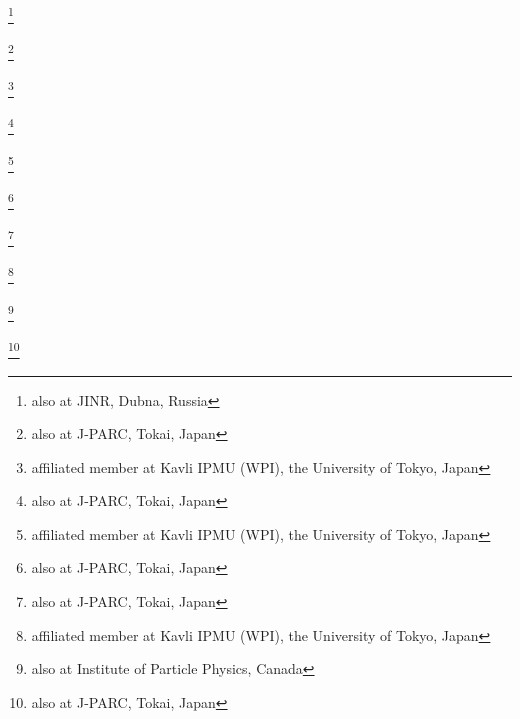 \documentclass[%
 reprint,
superscriptaddress,
 amsmath,amssymb,
 aps,
]{revtex4-1}
\begin{document}
\author{L.\,Pickard}\INSTFB
\author{E.S.\,Pinzon Guerra}\INSTH
\author{C.\,Pistillo}\INSTEE
\author{P.\,Plonski}\INSTDH
\author{E.\,Poplawska}\INSTFA
\author{B.\,Popov}\thanks{also at JINR, Dubna, Russia}\INSTBB
\author{M.\,Posiadala-Zezula}\INSTDJ
\author{J.-M.\,Poutissou}\INSTB
\author{R.\,Poutissou}\INSTB
\author{P.\,Przewlocki}\INSTDF
\author{B.\,Quilain}\INSTBA
\author{E.\,Radicioni}\INSTGF
\author{P.N.\,Ratoff}\INSTEJ
\author{M.\,Ravonel}\INSTEG
\author{M.A.M.\,Rayner}\INSTEG
\author{A.\,Redij}\INSTEE
\author{M.\,Reeves}\INSTEJ
\author{E.\,Reinherz-Aronis}\INSTFG
\author{C.\,Riccio}\INSTBE
\author{P.A.\,Rodrigues}\INSTGD
\author{P.\,Rojas}\INSTFG
\author{E.\,Rondio}\INSTDF
\author{S.\,Roth}\INSTBC
\author{A.\,Rubbia}\INSTEF
\author{D.\,Ruterbories}\INSTFG
\author{A.\,Rychter}\INSTDH
\author{R.\,Sacco}\INSTFA
\author{K.\,Sakashita}\thanks{also at J-PARC, Tokai, Japan}\INSTCB
\author{F.\,S\'anchez}\INSTED
\author{F.\,Sato}\INSTCB
\author{E.\,Scantamburlo}\INSTEG
\author{K.\,Scholberg}\thanks{affiliated member at Kavli IPMU (WPI), the University of Tokyo, Japan}\INSTFH
\author{S.\,Schoppmann}\INSTBC
\author{J.\,Schwehr}\INSTFG
\author{M.\,Scott}\INSTB
\author{Y.\,Seiya}\INSTCF
\author{T.\,Sekiguchi}\thanks{also at J-PARC, Tokai, Japan}\INSTCB
\author{H.\,Sekiya}\thanks{affiliated member at Kavli IPMU (WPI), the University of Tokyo, Japan}\INSTBJ\INSTHA
\author{D.\,Sgalaberna}\INSTEF
\author{R.\,Shah}\INSTEH\INSTGG
\author{F.\,Shaker}\INSTGH
\author{D.\,Shaw}\INSTEJ
\author{M.\,Shiozawa}\INSTBJ\INSTHA
\author{S.\,Short}\INSTFA
\author{Y.\,Shustrov}\INSTEB
\author{P.\,Sinclair}\INSTEI
\author{B.\,Smith}\INSTEI
\author{M.\,Smy}\INSTGA
\author{J.T.\,Sobczyk}\INSTEA
\author{H.\,Sobel}\INSTGA\INSTHA
\author{M.\,Sorel}\INSTEC
\author{L.\,Southwell}\INSTEJ
\author{P.\,Stamoulis}\INSTEC
\author{J.\,Steinmann}\INSTBC
\author{B.\,Still}\INSTFA
\author{Y.\,Suda}\INSTCH
\author{A.\,Suzuki}\INSTCC
\author{K.\,Suzuki}\INSTCD
\author{S.Y.\,Suzuki}\thanks{also at J-PARC, Tokai, Japan}\INSTCB
\author{Y.\,Suzuki}\INSTHA\INSTHA
\author{R.\,Tacik}\INSTE\INSTB
\author{M.\,Tada}\thanks{also at J-PARC, Tokai, Japan}\INSTCB
\author{S.\,Takahashi}\INSTCD
\author{A.\,Takeda}\INSTBJ
\author{Y.\,Takeuchi}\INSTCC\INSTHA
\author{H.K.\,Tanaka}\thanks{affiliated member at Kavli IPMU (WPI), the University of Tokyo, Japan}\INSTBJ
\author{H.A.\,Tanaka}\thanks{also at Institute of Particle Physics, Canada}\INSTD
\author{M.M.\,Tanaka}\thanks{also at J-PARC, Tokai, Japan}\INSTCB
\author{D.\,Terhorst}\INSTBC
\author{R.\,Terri}\INSTFA
\author{L.F.\,Thompson}\INSTFB
\author{A.\,Thorley}\INSTFC
\end{document}

